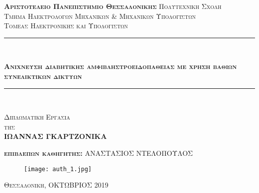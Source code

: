 \begin{titlepage}
\begin{center}


{\scshape\LARGE \textbf{Αριστοτελειο Πανεπιστημιο Θεσσαλονικης} Πολυτεχνικη Σχολη\\ Τμημα Ηλεκτρολογων Μηχανικων \& Μηχανικων Υπολογιστων\\ Τομεας Ηλεκτρονικης και Υπολογιστων \par}
  
  
  \vspace{1in}
  
  \begin{minipage}{1.05\textwidth}                          %
\rule{\textwidth}{2pt}\\[\dimexpr-\baselineskip+1mm+2pt]
\end{minipage}


{\scshape\Huge\bfseries Ανιχνευση διαβητικης αμφιβληστροειδοπαθειας με χρηση βαθιων συνελικτικων δικτυων
 \par}  
  
  
  \end{center}
    \begin{minipage}{1.05\textwidth}                          %
\rule{\textwidth}{2pt}\\[\dimexpr-\baselineskip+1mm+2pt]
\end{minipage}


  \begin{center}
  \vspace{0.45in}
{\scshape\huge Διπλωματικη Εργασια\\ \vspace{1,5mm} \small της \\ \vspace{1,5mm} \huge \textbf{ΙΩΑΝΝΑΣ ΓΚΑΡΤΖΟΝΙΚΑ}  \par}
 
  \vspace{7mm}
  
  {\scshape\LARGE \textbf{επιβλεπων καθηγητης:} ΑΝΑΣΤΑΣΙΟΣ ΝΤΕΛΟΠΟΥΛΟΣ \par}

\vspace{6mm}


 \begin{figure}[!h]
   \centering
      \texttt{[image: auth\_1.jpg]}%
  \end{figure}  
  
  \vfill

{\scshape\Large Θεσσαλονικη, ΟΚΤΩΒΡΙΟΣ 2019\par}
  \end{center}
\end{titlepage}
\thispagestyle{empty}
\newpage
\cleardoublepage
